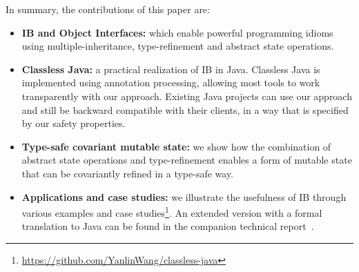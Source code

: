 In summary, the contributions of this paper are:
\begin{itemize}

\item {\bf IB and Object Interfaces:} which enable
  powerful programming idioms using multiple-inheritance,
  type-refinement and abstract state operations.

\item {\bf Classless Java:} a practical realization of IB in
  Java. Classless Java is implemented using annotation processing,
  allowing most tools to work transparently with our approach.
  Existing Java projects can use our approach and still be
  backward compatible with their clients, in a way that is specified
  by our safety properties.
\vspace{10pt}
\item {\bf Type-safe covariant mutable state:} we show how the
 combination of abstract state operations and type-refinement enables
 a form of mutable state that can be covariantly refined in a type-safe way.


\item {\bf Applications and case studies:} we illustrate the usefulness of IB
  through various examples and case studies\footnote{\url{https://github.com/YanlinWang/classless-java}}.
  An extended version with a formal translation to Java can be found in the
  companion technical report~\cite{classless}.


\end{itemize}
